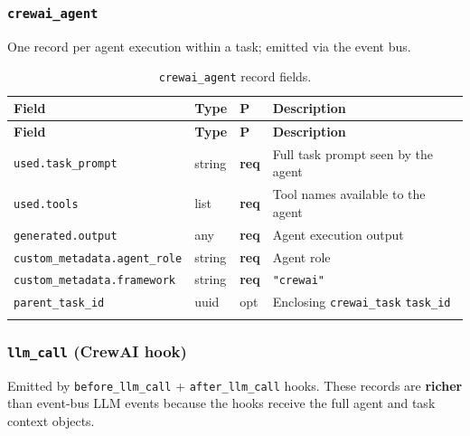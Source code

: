 \documentclass[11pt,a4paper]{article}
\newcommand{\opt}{\textcolor{optred}{opt}}
\newcommand{\req}{\textbf{req}}
\newcommand{\subtype}[1]{\texttt{\textcolor{subtypeblue}{#1}}}
\begin{document}
\subsubsection{\subtype{crewai\_agent}}

One record per agent execution within a task; emitted via the event bus.

\begin{longtable}{L{4cm} L{2.5cm} C{1.2cm} L{6.5cm}}
\toprule
\textbf{Field} & \textbf{Type} & \textbf{P} & \textbf{Description} \\
\midrule
\endfirsthead
\toprule \textbf{Field} & \textbf{Type} & \textbf{P} & \textbf{Description} \\
\midrule
\endhead
\bottomrule
\endlastfoot

\texttt{used.task\_prompt}           & string & \req & Full task prompt seen by the agent \\
\texttt{used.tools}                  & list   & \req & Tool names available to the agent \\
\texttt{generated.output}            & any    & \req & Agent execution output \\
\texttt{custom\_metadata.agent\_role}& string & \req & Agent role \\
\texttt{custom\_metadata.framework}  & string & \req & \texttt{"crewai"} \\
\texttt{parent\_task\_id}            & uuid   & \opt & Enclosing \subtype{crewai\_task} \texttt{task\_id} \\

\caption{\subtype{crewai\_agent} record fields.}
\end{longtable}

\subsubsection{\subtype{llm\_call} (CrewAI hook)}
\label{sec:llm-crewai}

Emitted by \texttt{before\_llm\_call} + \texttt{after\_llm\_call} hooks.
These records are \textbf{richer} than event-bus LLM events because the hooks
receive the full agent and task context objects.
\end{document}
